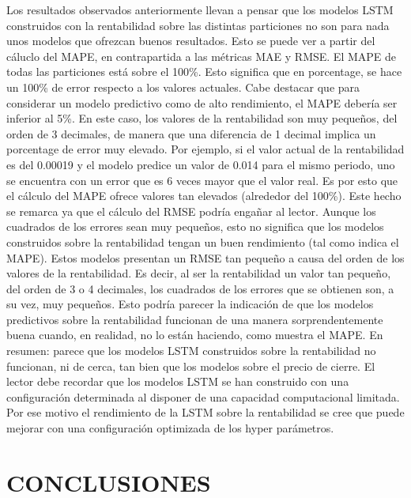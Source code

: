 \documentclass[]{DissertateUSU}
\begin{document}
\noindent Los resultados observados anteriormente llevan a pensar que
los modelos LSTM construidos con la rentabilidad sobre las distintas
particiones no son para nada unos modelos que ofrezcan buenos
resultados. Esto se puede ver a partir del cáluclo del MAPE, en
contrapartida a las métricas MAE y RMSE. El MAPE de todas las
particiones está sobre el 100\%. Esto significa que en porcentage, se
hace un 100\% de error respecto a los valores actuales. Cabe destacar
que para considerar un modelo predictivo como de alto rendimiento, el
MAPE debería ser inferior al 5\%. En este caso, los valores de la
rentabilidad son muy pequeños, del orden de 3 decimales, de manera que
una diferencia de 1 decimal implica un porcentage de error muy elevado.
Por ejemplo, si el valor actual de la rentabilidad es del 0.00019 y el
modelo predice un valor de 0.014 para el mismo periodo, uno se encuentra
con un error que es 6 veces mayor que el valor real. Es por esto que el
cálculo del MAPE ofrece valores tan elevados (alrededor del 100\%). Este
hecho se remarca ya que el cálculo del RMSE podría engañar al lector.
Aunque los cuadrados de los errores sean muy pequeños, esto no significa
que los modelos construidos sobre la rentabilidad tengan un buen
rendimiento (tal como indica el MAPE). Estos modelos presentan un RMSE
tan pequeño a causa del orden de los valores de la rentabilidad. Es
decir, al ser la rentabilidad un valor tan pequeño, del orden de 3 o 4
decimales, los cuadrados de los errores que se obtienen son, a su vez,
muy pequeños. Esto podría parecer la indicación de que los modelos
predictivos sobre la rentabilidad funcionan de una manera
sorprendentemente buena cuando, en realidad, no lo están haciendo, como
muestra el MAPE. En resumen: parece que los modelos LSTM construidos
sobre la rentabilidad no funcionan, ni de cerca, tan bien que los
modelos sobre el precio de cierre. El lector debe recordar que los
modelos LSTM se han construido con una configuración determinada al
disponer de una capacidad computacional limitada. Por ese motivo el
rendimiento de la LSTM sobre la rentabilidad se cree que puede mejorar
con una configuración optimizada de los hyper parámetros.

\FloatBarrier
\newpage
{}
\fancyhead[R]{\thechapter}
\fancyfoot[C]{}

\chapter{\textbf{CONCLUSIONES}}
\end{document}
